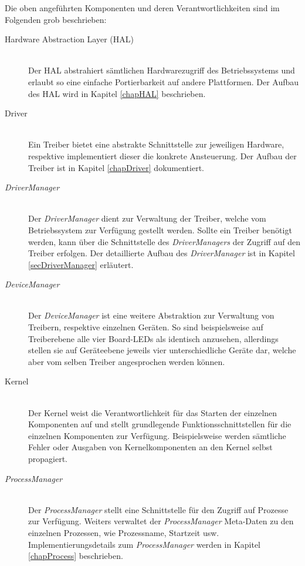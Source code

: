 Die oben angeführten Komponenten und deren Verantwortlichkeiten sind im Folgenden grob beschrieben: \\

\begin{description}
	\item[Hardware Abstraction Layer (HAL)] \hfill \\
	Der \ac{HAL} abstrahiert sämtlichen Hardwarezugriff des Betriebssystems und erlaubt so eine einfache Portierbarkeit auf andere Plattformen. Der Aufbau des \ac{HAL} wird in Kapitel \ref{chapHAL} beschrieben.
	
	\item[Driver] \hfill \\
	Ein Treiber bietet eine abstrakte Schnittstelle zur jeweiligen Hardware, respektive implementiert dieser die konkrete Ansteuerung. Der Aufbau der Treiber ist in Kapitel \ref{chapDriver} dokumentiert. 
	
	\item[\textit{DriverManager}] \hfill \\
	Der \textit{DriverManager} dient zur Verwaltung der Treiber, welche vom Betriebssystem zur Verfügung gestellt werden. Sollte ein Treiber benötigt werden, kann über die Schnittstelle des \textit{DriverManagers} der Zugriff auf den Treiber erfolgen. Der detaillierte Aufbau des \textit{DriverManager} ist in Kapitel \ref{secDriverManager} erläutert.
	
	\item[\textit{DeviceManager}] \hfill \\
	Der \textit{DeviceManager} ist eine weitere Abstraktion zur Verwaltung von Treibern, respektive einzelnen Geräten. So sind beispielsweise auf Treiberebene alle vier Board-LEDs als identisch anzusehen, allerdings stellen sie auf Geräteebene jeweils vier unterschiedliche Geräte dar, welche aber vom selben Treiber angesprochen werden können.
	
	\item[Kernel] \hfill \\
	Der Kernel weist die Verantwortlichkeit für das Starten der einzelnen Komponenten auf und stellt grundlegende Funktionsschnittstellen für die einzelnen Komponenten zur Verfügung. Beispielsweise werden sämtliche Fehler oder Ausgaben von Kernelkomponenten an den Kernel selbst propagiert.
	
	\item[\textit{ProcessManager}] \hfill \\
	Der \textit{ProcessManager} stellt eine Schnittstelle für den Zugriff auf Prozesse zur Verfügung. Weiters verwaltet der \textit{ProcessManager} Meta-Daten zu den einzelnen Prozessen, wie Prozessname, Startzeit usw. Implementierungsdetails zum \textit{ProcessManager} werden in Kapitel \ref{chapProcess} beschrieben.
	

\end{description}
